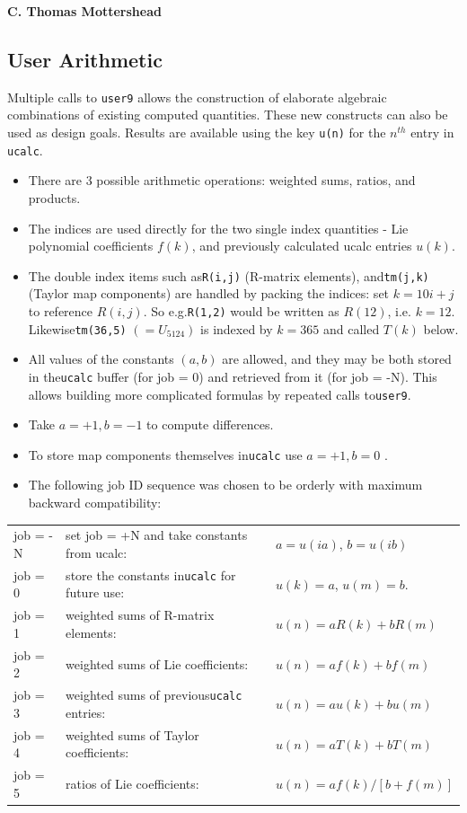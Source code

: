 \documentclass[11pt]{article} %
\newcommand{\bit}{\begin{itemize}}
\newcommand{\eit}{\end{itemize}}
\newcommand{\sub}{\subsection}
\newcommand{\edes}{\end{description}}
\newcommand{\vb}{\verb ;}
\begin{document}
\begin{center}  {\bf C. Thomas Mottershead }
\sub{User Arithmetic}
Multiple calls to \vb user9; allows the construction of elaborate algebraic combinations of existing computed quantities. These new constructs can also be used as design goals. Results are available using the key \vb u(n); for the $n^{th}$ entry in \vb ucalc;.

\bit
\item There are 3 possible arithmetic operations: weighted sums, ratios, and products. 
\item The indices are used directly for the two single index quantities - Lie polynomial coefficients $f(k)$, and previously calculated ucalc entries $u(k)$.
\item The double index items such as\vb R(i,j); (R-matrix elements), and\vb tm(j,k); (Taylor map components) are handled by packing the indices: set $k = 10i+j$ to reference $R(i,j)$. 
So e.g.\vb R(1,2); would be written as $R(12)$, i.e. $k=12$. Likewise\vb tm(36,5); $(=U_{5124})$ is indexed by $k=365$ and called $T(k)$ below. 
\item All values of the constants $(a,b)$ are allowed, and they may be both stored in the\vb ucalc; buffer (for job = 0) and retrieved from it (for job = -N). This allows building more complicated formulas by repeated calls to\vb user9;.
\item Take $a=+1, b=-1$ to compute differences.
\item To store map components themselves in\vb ucalc; use $a=+1, b=0$ .
\item The following job ID sequence was chosen to be orderly with maximum backward compatibility:
\eit
\hspace{0.8 in }\begin{tabular}{l|l|l}  %
        job = -N & set job = +N and take constants from ucalc:  &  $a=u(ia)$, $b=u(ib)$  \\
        job = 0 &  store the constants in\vb ucalc; for future use:  &  $u(k) = a$, $u(m) = b$. \\
  \hline
        job = 1 & weighted sums of R-matrix elements:  &  $u(n)=aR(k)+bR(m)$  \\
        job = 2 & weighted sums of Lie coefficients: & $u(n)=af(k)+bf(m)$  \\  
        job = 3 & weighted sums of previous\vb ucalc; entries: & $u(n)=au(k)+bu(m)$ \\        
        job = 4 & weighted sums of Taylor coefficients:  & $u(n)=aT(k)+bT(m)$  \\
 \hline
        job = 5 & ratios of Lie coefficients: & $u(n)=af(k)/[b+f(m)]$  \\               

\end{tabular}
\end{center}
\end{document}
